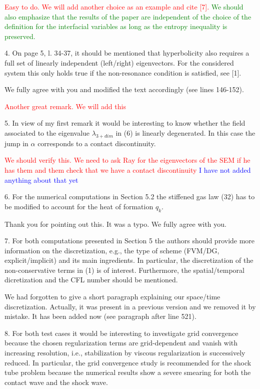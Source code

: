 \documentclass{article}
\newcommand{\tcr}[1]{\textcolor{red}{#1}}
\newcommand{\tcb}[1]{\textcolor{blue}{#1}}
\newcommand{\tcg}[1]{\textcolor{green}{#1}}
\begin{document}
\tcr{Easy to do. We will add another choice as an example and cite [7].} \tcg{We should also emphasize that the
results of the paper are independent of the choice of the definition for the interfacial variables as long as the entropy inequality is preserved.}
\bigskip


{\color{blue}
4. On page 5, l. 34-37, it should be mentioned that hyperbolicity also requires a full
set of linearly independent (left/right) eigenvectors. For the considered system this
only holds true if the non-resonance condition is satisfied, see [1].
}

We fully agree with you and modified the text accordingly (see lines 146-152).

\tcr{Another great remark. We will add this}
\bigskip


{\color{blue}
5. In view of my first remark it would be interesting to know whether the field associated
to the eigenvalue $\lambda_{3+dim}$ in (6) is linearly degenerated. In this case the jump in $\alpha$
corresponds to a contact discontinuity.
}

\tcr{We should verify this. We need to ask Ray for the eigenvectors of the SEM if he has them and them check that
we have a contact discontinuity} \tcb{I have not added anything about that yet}
\bigskip


{\color{blue}
6. For the numerical computations in Section 5.2 the stiffened gas law (32) has to be
modified to account for the heat of formation $q_k$.}

Thank you for pointing out this. It was a typo. We fully agree with you.
\bigskip


{\color{blue}
7. For both computations presented in Section 5 the authors should provide more 
information on the discretization, e.g., the type of scheme (FVM/DG, explicit/implicit)
and its main ingredients. In particular, the discretization of the non-conservative
terms in (1) is of interest. Furthermore, the spatial/temporal dicretization and the
CFL number should be mentioned.}

We had forgotten to give a short paragraph explaining our space/time discretization.
Actually, it was present in a previous version and we removed it by mistake. It has 
been added now (see paragraph after line 521).
\bigskip


{\color{blue}
8. For both test cases it would be interesting to investigate grid convergence because the
chosen regularization terms are grid-dependent and vanish with increasing resolution,
i.e., stabilization by viscous regularization is successively reduced. In particular, the
grid convergence study is recommended for the shock tube problem because the
numerical results show a severe smearing for both the contact wave and the shock
wave.}
\end{document}

